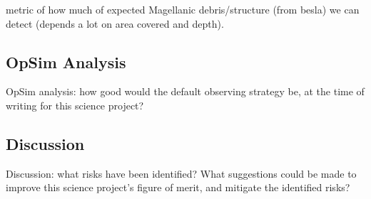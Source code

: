 \item metric of how much of expected Magellanic debris/structure (from besla) we can detect (depends a lot on area
covered and depth).



\subsection{OpSim Analysis}
\label{sec:keyword:analysis}

OpSim analysis: how good would the default observing strategy be, at
the time of writing for this science project?



\subsection{Discussion}
\label{sec:keyword:discussion}

Discussion: what risks have been identified? What suggestions could be
made to improve this science project's figure of merit, and mitigate
the identified risks?



\navigationbar
